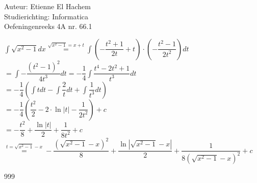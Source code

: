 \documentclass[a4paper]{article}
\begin{document}
  
\noindent \large Auteur: Etienne El Hachem \\
\noindent \large Studierichting: Informatica\\
\noindent \large Oefeningenreeks 4A nr. 66.1\\

\medskip

\normalsize

$\displaystyle\int\sqrt{x^2-1}dx \stackrel{\sqrt{x^2-1} = x + t}{=} \displaystyle\int\left(-\dfrac{t^2+1}{2t}+t\right)\cdot\left(-\dfrac{t^2-1}{2t^2}\right)dt $\\

$ = \displaystyle\int-\dfrac{\left(t^2-1\right)^2}{4t^3}dt = -\dfrac{1}{4}\displaystyle\int\dfrac{t^4-2t^2+1}{t^3}dt $\\

$ =  -\dfrac{1}{4}\left(\displaystyle\int tdt - \displaystyle\int\dfrac{2}{t}dt + \displaystyle\int\dfrac{1}{t^3}dt\right) $\\

$ = -\dfrac{1}{4}\left(\dfrac{t^2}{2}-2\cdot\ln|t|-\dfrac{1}{2t^2}\right) + c $\\

$ = -\dfrac{t^2}{8} + \dfrac{\ln|t|}{2} + \dfrac{1}{8t^2} + c $\\

$ \stackrel{t = \sqrt{x^2-1} - x}{=}  -\dfrac{\left(\sqrt{x^2-1} - x\right)^2}{8} + \dfrac{\ln\left|\sqrt{x^2-1} - x\right|}{2} + \dfrac{1}{8\left(\sqrt{x^2-1} - x\right)^2} + c $\\

\begin{thebibliography}{999}
\end{thebibliography}
\end{document}
